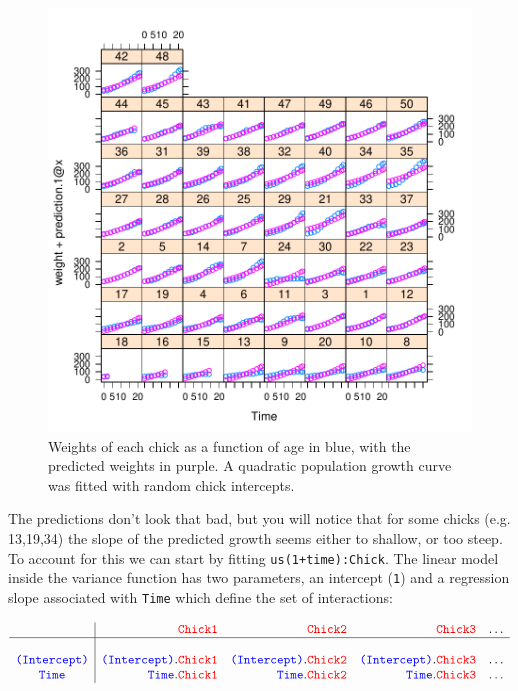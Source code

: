 \documentclass{article}
\begin{document}
\begin{figure}[!h]
\begin{center}
\includegraphics{Lecture4-014}
\end{center}
\caption{Weights of each chick as a function of age in blue, with the predicted weights in purple. A quadratic population growth curve was fitted with random chick intercepts.}
\label{CWpred.1-fig}
\end{figure}

The predictions don't look that bad, but you will notice that for some chicks (e.g. 13,19,34) the slope of the predicted growth seems either to shallow, or too steep. To account for this we can start by fitting \texttt{us(1+time):Chick}. The linear model inside the variance function has two parameters, an intercept (\texttt{1}) and a regression slope associated with \texttt{Time} which define the set of interactions:


\begin{displaymath}
\begin{array}{c|rrrrrc}
&{\color{red} \texttt{Chick1}}&{\color{red} \texttt{Chick2}}&{\color{red} \texttt{Chick3}}&\dots\\
\hline\\
{\color{blue} \texttt{(Intercept)}}&{\color{blue} \texttt{(Intercept)}}.{\color{red} \texttt{Chick1}}&{\color{blue} \texttt{(Intercept)}}.{\color{red} \texttt{Chick2}}&{\color{blue} \texttt{(Intercept)}}.{\color{red} \texttt{Chick3}}&\dots\\
{\color{blue} \texttt{Time}}&{\color{blue} \texttt{Time}}.{\color{red} \texttt{Chick1}}&{\color{blue} \texttt{Time}}.{\color{red} \texttt{Chick2}}&{\color{blue} \texttt{Time}}.{\color{red} \texttt{Chick3}}&\dots\\
\end{array}
\end{displaymath}
\end{document}
